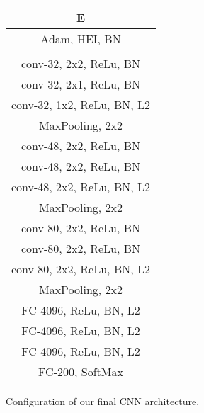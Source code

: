 \begin{tabular}{|c|}
  \hline
  \multicolumn{1}{|c|}{E}
  \\\hline
  Adam, HEI, BN
  \\\hhline{|=|}

  \multicolumn{1}{|c|}{input ($64\times64\times3\;RGB\;image$)}
  \\\hline

  conv-32, 2x2, ReLu, BN
  \\
  conv-32, 2x1, ReLu, BN
  \\
  conv-32, 1x2, ReLu, BN, L2
  \\\hline
  MaxPooling, 2x2
  \\\hline
  conv-48, 2x2, ReLu, BN
  \\
  conv-48, 2x2, ReLu, BN
  \\
  conv-48, 2x2, ReLu, BN, L2
  \\\hline
  MaxPooling, 2x2
  \\\hline
  conv-80, 2x2, ReLu, BN
  \\
  conv-80, 2x2, ReLu, BN
  \\
  conv-80, 2x2, ReLu, BN, L2
  \\\hline
  MaxPooling, 2x2
  \\\hline
  FC-4096, ReLu, BN, L2
  \\\hline
  FC-4096, ReLu, BN, L2
  \\\hline
  FC-4096, ReLu, BN, L2
  \\\hline
  FC-200, SoftMax
  \\\hline
  \end{tabular}
\caption[]
{\small
  Configuration of our final CNN architecture.
}
\label{table:final_config}
